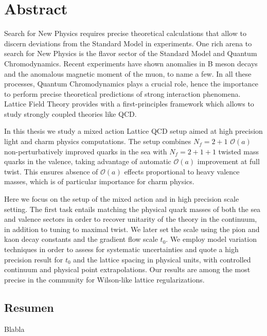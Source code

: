 \begingroup
\let\clearpage\relax
\let\cleardoublepage\relax
\let\cleardoublepage\relax

\chapter*{Abstract}
Search for New Physics requires precise theoretical calculations that allow to discern deviations from the Standard Model in experiments. One rich arena to search for New Physics is the flavor sector of the Standard Model and Quantum Chromodynamics. Recent experiments have shown anomalies in B meson decays and the anomalous magnetic moment of the muon, to name a few. In all these processes, Quantum Chromodynamics plays a crucial role, hence the importance to perform precise theoretical predictions of strong interaction phenomena. Lattice Field Theory provides with a first-principles framework which allows to study strongly coupled theories like QCD.

In this thesis we study a mixed action Lattice QCD setup aimed at high precision light and charm physics computations. The setup combines $N_f=2+1$ $\mathcal{O}(a)$ non-perturbatively improved quarks in the sea with $N_f=2+1+1$ twisted mass quarks in the valence, taking advantage of automatic $\mathcal{O}(a)$ improvement at full twist. This ensures absence of $\mathcal{O}(a)$ effects proportional to heavy valence masses, which is of particular importance for charm physics. 

Here we focus on the setup of the mixed action and in high precision scale setting. The first task entails matching the physical quark masses of both the sea and valence sectors in order to recover unitarity of the theory in the continuum, in addition to tuning to maximal twist. We later set the scale using the pion and kaon decay constants and the gradient flow scale $t_0$. We employ model variation techniques in order to assess for systematic uncertainties and quote a high precision result for $t_0$ and the lattice spacing in physical units, with controlled continuum and physical point extrapolations. Our results are among the most precise in the community for Wilson-like lattice regularizations.

\vfill

\begin{otherlanguage}{spanish}
\chapter*{Resumen}
Blabla
\end{otherlanguage}

\endgroup

\vfill
